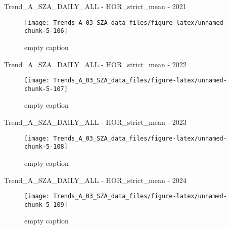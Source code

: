 \documentclass[
  10pt,
  a4paper,oneside]{article}
\begin{document}
Trend\_A\_SZA\_DAILY\_ALL - HOR\_strict\_mean - 2021

\begin{figure}[!ht]

{\centering \texttt{[image: Trends\_A\_03\_SZA\_data\_files/figure-latex/unnamed-chunk-5-106]} 

}

\caption{ empty caption }\label{fig:unnamed-chunk-5-106}
\end{figure}

Trend\_A\_SZA\_DAILY\_ALL - HOR\_strict\_mean - 2022

\begin{figure}[!ht]

{\centering \texttt{[image: Trends\_A\_03\_SZA\_data\_files/figure-latex/unnamed-chunk-5-107]} 

}

\caption{ empty caption }\label{fig:unnamed-chunk-5-107}
\end{figure}

Trend\_A\_SZA\_DAILY\_ALL - HOR\_strict\_mean - 2023

\begin{figure}[!ht]

{\centering \texttt{[image: Trends\_A\_03\_SZA\_data\_files/figure-latex/unnamed-chunk-5-108]} 

}

\caption{ empty caption }\label{fig:unnamed-chunk-5-108}
\end{figure}

Trend\_A\_SZA\_DAILY\_ALL - HOR\_strict\_mean - 2024

\begin{figure}[!ht]

{\centering \texttt{[image: Trends\_A\_03\_SZA\_data\_files/figure-latex/unnamed-chunk-5-109]} 

}

\caption{ empty caption }\label{fig:unnamed-chunk-5-109}
\end{figure}
\end{document}
